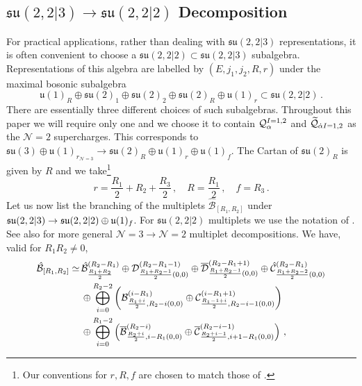 \documentclass[main.tex]{subfiles}
\begin{document}
\subsection{\texorpdfstring{$\mathfrak{su}(2,2|3)\to\mathfrak{su}(2,2|2)$}{su(2,2|3)->su(2,2|2)} Decomposition}
For practical applications, rather than dealing with $\mathfrak{su}(2,2|3)$ representations, it is often convenient to choose a $\mathfrak{su}(2,2|2)\subset \mathfrak{su}(2,2|3)$ subalgebra. Representations of this algebra are labelled by $(E,j_1,j_2,R,r)$ under the maximal bosonic subalgebra
\begin{equation}\label{eqn:su222maximal}
\mathfrak{u}(1)_R\oplus\mathfrak{su}(2)_{1}\oplus\mathfrak{su}(2)_2\oplus\mathfrak{su}(2)_R\oplus\mathfrak{u}(1)_r\subset\mathfrak{su}(2,2|2)\,.
\end{equation} 
There are essentially three different choices of such subalgebras. Throughout this paper we will require only one and we choose it to contain $\mathcal{Q}_{\alpha}^{I=1,2}$ and $\widetilde{\mathcal{Q}}_{\dot\alpha I=1,2}$ as the $\mathcal{N}=2$ supercharges. This corresponds to $\mathfrak{su}(3)\oplus\mathfrak{u}(1)_{r_{\mathcal{N}=3}}\to\mathfrak{su}(2)_R\oplus\mathfrak{u}(1)_r\oplus\mathfrak{u}(1)_f$. The Cartan of $\mathfrak{su}(2)_R$ is given by $R$ and we take\footnote{Our conventions for $r,R,f$ are chosen to match those of \cite{Nishinaka:2016hbw}.}
\begin{equation}\label{eqn:N2subalgebra}
r=\frac{R_1}{2}+R_2+\frac{R_3}{2}\,,\quad R=\frac{R_1}{2}\,,\quad f=R_3\,.
\end{equation}
Let us now list the branching of the multiplets $\hat{\mathcal{B}}_{[R_1,R_2]}$ under $\mathfrak{su}(2,2|3)\color{black}\to\mathfrak{su}(2,2|2)\oplus\mathfrak{u}(1)_f$. For $\mathfrak{su}(2,2|2)$ multiplets we use the notation of \cite{DolanOsborn}. See also \cite{Cordova:2016emh,Lemos:2016xke} for more general $\mathcal{N}=3\to\mathcal{N}=2$ multiplet decompositions. We have, valid for $R_1R_2\neq0$,
\begin{equation}\label{eqn:Bnmdecomp}
\begin{aligned}
\hat{\mathcal{B}}_{[R_1,R_2]}\color{black}\simeq\,& \hat{\mathcal{B}}^{(R_2-R_1)}_{\frac{R_1+R_2}{2}}\oplus\mathcal{D}^{(R_2-R_1-1)}_{\frac{R_1+R_2-1}{2}(0,0)}\oplus\overline{\mathcal{D}}^{(R_2-R_1+1)}_{\frac{R_1+R_2-1}{2}(0,0)}\oplus\hat{\mathcal{C}}^{(R_2-R_1)}_{\frac{R_1+R_2-2}{2}(0,0)}\\
&\oplus\bigoplus_{i=0}^{R_2-2}\left(\mathcal{B}_{\frac{R_1+i}{2},R_2-i(0,0)}^{(i-R_1)}\oplus\mathcal{C}_{\frac{R_1-1+i}{2},R_2-i-1(0,0)}^{(i-R_1+1)}\right)\\
&\oplus\bigoplus_{i=0}^{R_1-2}\left(\overline{\mathcal{B}}_{\frac{R_2+i}{2},i-R_1(0,0)}^{(R_2-i)}\oplus\overline{\mathcal{C}}_{\frac{R_2+i-1}{2},i+1-R_1(0,0)}^{(R_2-i-1)}\right) \, ,
\end{aligned}
\end{equation}
\end{document}
